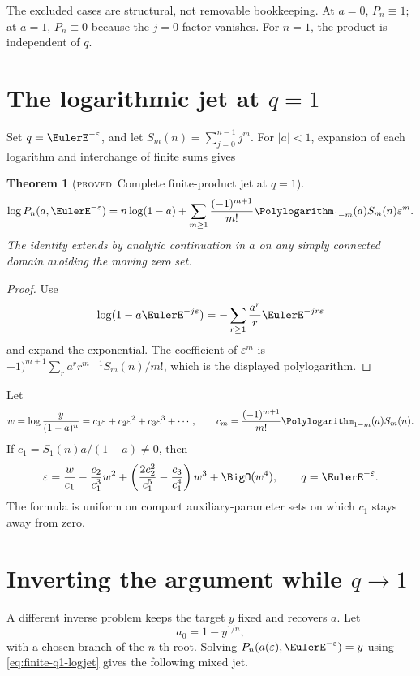\documentclass[11pt,letterpaper,oneside,openany]{book}
\newtheorem{theorem}{Theorem}[chapter]
\theoremstyle{definition}
\theoremstyle{remark}
\newcommand{\statusproved}{\textcolor{provedgreen}{\textsc{proved}}}
\begin{document}
The excluded cases are structural, not removable bookkeeping.  At \(a=0\),
\(P_n\equiv1\); at \(a=1\), \(P_n\equiv0\) because the \(j=0\) factor vanishes.
For \(n=1\), the product is independent of \(q\).

\section{The logarithmic jet at \(q=1\)}
Set \(q=\EulerE^{-\varepsilon}\), and let
\(S_m(n)=\sum_{j=0}^{n-1}j^m\).  For \(|a|<1\), expansion of each logarithm and
interchange of finite sums gives
\begin{theorem}[\statusproved\ Complete finite-product jet at \(q=1\)]
\begin{equation}
 \log P_n(a,\EulerE^{-\varepsilon})
 =n\log(1-a)+\sum_{m\ge1}
 \frac{(-1)^{m+1}}{m!}
 \Polylogarithm_{1-m}(a)S_m(n)\varepsilon^m.
 \label{eq:finite-q1-logjet}
\end{equation}
The identity extends by analytic continuation in \(a\) on any simply connected
domain avoiding the moving zero set.
\end{theorem}
\begin{proof}
Use
\[
 \log(1-a\EulerE^{-j\varepsilon})
 =-\sum_{r\ge1}\frac{a^r}{r}\EulerE^{-jr\varepsilon}
\]
and expand the exponential.  The coefficient of \(\varepsilon^m\) is
\(-1)^{m+1}\sum_r a^rr^{m-1}S_m(n)/m!\), which is the displayed
polylogarithm.
\end{proof}

Let
\[
 w=\log\frac{y}{(1-a)^n}=c_1\varepsilon+c_2\varepsilon^2+c_3\varepsilon^3+\cdots,
 \qquad
 c_m=\frac{(-1)^{m+1}}{m!}\Polylogarithm_{1-m}(a)S_m(n).
\]
If \(c_1=S_1(n)a/(1-a)\ne0\), then
\begin{equation}
 \varepsilon=
 \frac{w}{c_1}-\frac{c_2}{c_1^3}w^2
 +\left(\frac{2c_2^2}{c_1^5}-\frac{c_3}{c_1^4}\right)w^3
 +\BigO(w^4),
 \qquad q=\EulerE^{-\varepsilon}.
 \label{eq:finite-q1-base-inverse}
\end{equation}
The formula is uniform on compact auxiliary-parameter sets on which \(c_1\)
stays away from zero.

\section{Inverting the argument while \(q\to1\)}
A different inverse problem keeps the target \(y\) fixed and recovers \(a\).
Let
\[
 a_0=1-y^{1/n},
\]
with a chosen branch of the \(n\)-th root.  Solving
\(P_n(a(\varepsilon),\EulerE^{-\varepsilon})=y\) using
\cref{eq:finite-q1-logjet} gives the following mixed jet.
\end{document}
